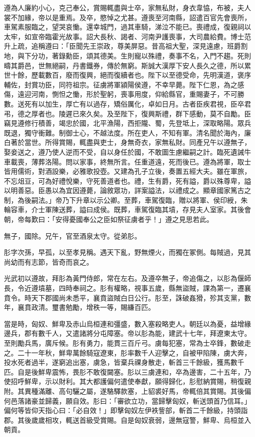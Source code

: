 \begin{pinyinscope}
遵為人廉約小心，克己奉公，賞賜輒盡與士卒，家無私財，身衣韋恊，布被，夫人裳不加緣，帝以是重焉。及卒，愍悼之尤甚。遵喪至河南縣，詔遣百官先會喪所，車駕素服臨之，望哭哀慟。還幸城門，過其車騎，涕泣不能已。喪禮成，復親祠以太牢，如宣帝臨霍光故事。詔大長秋、謁者、河南尹護喪事，大司農給費。博士范升上疏，追稱遵曰：「臣聞先王崇政，尊美屏惡。昔高祖大聖，深見遠慮，班爵割地，與下分功，著錄勳臣，頌其德美。生則寵以殊禮，奏事不名，入門不趨。死則疇其爵邑，世無絕嗣，丹書鐵券，傳於無窮。斯誠大漢厚下安人長久之德，所以累世十餘，歷載數百，廢而復興，絕而復續者也。陛下以至德受命，先明漢道，褒序輔佐，封賞功臣，同符祖宗。征虜將軍潁陽侯遵，不幸早薨。陛下仁恩，為之感傷，遠迎河南，惻怛之慟，形於聖躬，喪事用度，仰給縣官，重賜妻子，不可勝數。送死有以加生，厚亡有以過存，矯俗厲化，卓如日月。古者臣疾君視，臣卒君弔，德之厚者也。陵遲已來久矣。及至陛下，復興斯禮，群下感動，莫不自勵。臣竊見遵修行積善，竭忠於國，北平漁陽，西拒隴、蜀，先登坻上，深取略陽。眾兵既退，獨守衝難。制御士心，不越法度。所在吏人，不知有軍。清名聞於海內，廉白著於當世。所得賞賜，輒盡與吏士，身無奇衣，家無私財。同產兄午以遵無子，娶妾送之，遵乃使人逆而不受，自以身任於國，不敢圖生慮繼嗣之計。臨死遺誡牛車載喪，薄葬洛陽。問以家事，終無所言。任重道遠，死而後已。遵為將軍，取士皆用儒術，對酒設樂，必雅歌投壺。又建為孔子立後，奏置五經大夫。雖在軍旅，不忘俎豆，可為好禮悅樂，守死善道者也。禮，生有爵，死有謚，爵以殊尊卑，謚以明善惡。臣愚以為宜因遵薨，論敘眾功，詳案謚法，以禮成之。顯章國家篤古之制，為後嗣法。」帝乃下升章以示公卿。至葬，車駕復臨，贈以將軍、侯印綬，朱輪容車，介士軍陳送葬，謚曰成侯。既葬，車駕復臨其墳，存見夫人室家。其後會朝，帝每歎曰：「安得憂國奉公之臣如祭征虜者乎！」遵之見思若此。

無子，國除。兄午，官至酒泉太守。從弟肜。

肜字次孫，早孤，以至孝見稱。遇天下亂，野無煙火，而獨在冢側。每賊過，見其尚幼而有志節，皆奇而哀之。

光武初以遵故，拜肜為黃門侍郎，常在左右。及遵卒無子，帝追傷之，以肜為偃師長，令近遵墳墓，四時奉祠之。肜有權略，視事五歲，縣無盜賊，課為第一，遷襄賁令。時天下郡國尚未悉平，襄賁盜賊白日公行。肜至，誅破姦猾，殄其支黨，數年，襄賁政清。璽書勉勵，增秩一等，賜縑百匹。

當是時，匈奴、鮮卑及赤山烏桓連和彊盛，數入塞殺略吏人。朝廷以為憂，益增緣邊兵，郡有數千人，又遣諸將分屯障塞。帝以肜為能，建武十七年，拜遼東太守。至則勵兵馬，廣斥候。肜有勇力，能貫三百斤弓。虜每犯塞，常為士卒鋒，數破走之。二十一年秋，鮮卑萬餘騎寇遼東，肜率數千人迎擊之，自被甲陷陳，虜大奔，投水死者過半，遂窮追出塞，虜急，皆棄兵祼身散走，斬首三千餘級，獲馬數千匹。自是後鮮卑震怖，畏肜不敢復闚塞。肜以三虜連和，卒為邊害，二十五年，乃使招呼鮮卑，示以財利。其大都護偏何遣使奉獻，願得歸化，肜慰納賞賜，稍復親附。其異種滿離、高句驪之屬，遂駱驛款塞，上貂裘好馬，帝輒倍其賞賜。其後偏何邑落諸豪並歸義，願自效。肜曰：「審欲立功，當歸擊匈奴，斬送頭首乃信耳。」偏何等皆仰天指心曰：「必自效！」即擊匈奴左伊袟訾部，斬首二千餘級，持頭詣郡。其後歲歲相攻，輒送首級受賞賜。自是匈奴衰弱，邊無寇警，鮮卑、烏桓並入朝貢。


\end{pinyinscope}
